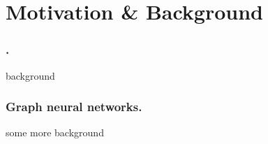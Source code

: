 \section{Motivation \& Background}
\label{sec:motivation}
\subsubsection{.}
background 
\subsubsection{Graph neural networks.} 
some more background